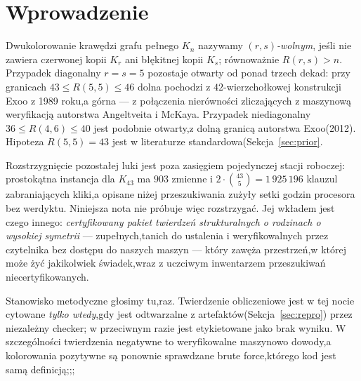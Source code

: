\documentclass[11pt]{article}
\theoremstyle{definition}
\theoremstyle{plain}
\newcommand{\K}{\ensuremath{K}}
\newcommand{\R}[2]{\ensuremath{R(#1,#2)}}
\begin{document}
\section{Wprowadzenie}

Dwukolorowanie krawędzi grafu pełnego $\K_n$ nazywamy \emph{$(r,s)$-wolnym}, jeśli nie zawiera czerwonej kopii $\K_r$ ani błękitnej kopii $\K_s$; równoważnie $\R{r}{s} > n$. Przypadek diagonalny $r=s=5$ pozostaje otwarty od ponad trzech dekad: przy granicach $43 \le \R{5}{5} \le 46$ dolna pochodzi z $42$-wierzchołkowej konstrukcji Exoo z 1989 roku,a górna --- z połączenia nierówności zliczających z maszynową weryfikacją autorstwa Angeltveita i McKaya. Przypadek niediagonalny $36 \le \R{4}{6} \le 40$ jest podobnie otwarty,z dolną granicą autorstwa Exoo(2012). Hipoteza $\R{5}{5} = 43$ jest w literaturze standardowa(Sekcja~\ref{sec:prior}.



Rozstrzygnięcie pozostałej luki jest poza zasięgiem pojedynczej stacji roboczej: prostokątna instancja dla $\K_{43}$ ma $903$ zmienne i $2 \cdot \binom{43}{5} = 1\,925\,196$ klauzul zabraniających kliki,a opisane niżej przeszukiwania zużyły setki godzin procesora bez werdyktu. Niniejsza nota nie próbuje więc rozstrzygać. Jej wkładem jest czego innego: \emph{certyfikowany pakiet twierdzeń strukturalnych o rodzinach o wysokiej symetrii} --- zupełnych,tanich do ustalenia i weryfikowalnych przez czytelnika bez dostępu do naszych maszyn --- który zawęża przestrzeń,w której może żyć jakikolwiek świadek,wraz z uczciwym inwentarzem przeszukiwań niecertyfikowanych.



Stanowisko metodyczne głosimy tu,raz. Twierdzenie obliczeniowe jest w tej nocie cytowane \emph{tylko wtedy},gdy jest odtwarzalne z artefaktów(Sekcja~\ref{sec:repro}) przez niezależny checker; w przeciwnym razie jest etykietowane jako brak wyniku. W szczególności twierdzenia negatywne to weryfikowalne maszynowo dowody,a kolorowania pozytywne są ponownie sprawdzane brute force,którego kod jest samą definicją;;;
\end{document}
